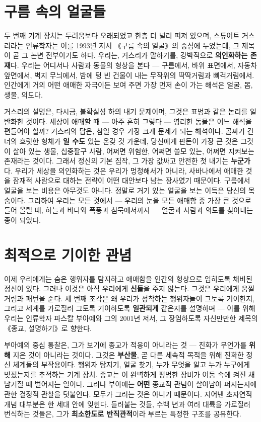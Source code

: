 \section*{구름 속의 얼굴들}

두 번째 기계 장치는 두려움보다 오래되었고 한층 더 널리 퍼져 있으며, 스튜어트 거스리라는 인류학자는 이를 1993년 저서 《구름 속의 얼굴》의 중심에 두었는데, 그 제목이 곧 그 논변 전부이기도 하다. 우리는, 거스리가 말하기를, 강박적으로 \textbf{의인화하는 존재}다. 우리는 어디서나 사람과 동물의 형상을 본다 — 구름에서, 바위 표면에서, 자동차 앞면에서, 벽지 무늬에서, 밤에 텅 빈 건물이 내는 무작위의 딱딱거림과 삐걱거림에서. 인간에게 거의 어떤 애매한 자극이든 보여 주면 가장 먼저 손이 가는 해석은 얼굴, 몸, 생물, 의도다.

거스리의 설명은, 다시금, 불확실성 하의 내기 문제이며, 그것은 표범과 같은 논리를 일반화한 것이다. 세상이 애매할 때 — 아주 흔히 그렇다 — 영리한 동물은 어느 해석을 편들어야 할까? 거스리의 답은, 참일 경우 가장 크게 문제가 되는 해석이다. 골짜기 건너의 흐릿한 형체가 \textbf{일 수도} 있는 온갖 것 가운데, 당신에게 판돈이 가장 큰 것은 그것이 살아 있는 생물, 십중팔구 사람, 어쩌면 위험한, 어쩌면 쓸모 있는, 어쩌면 지켜보는 존재라는 것이다. 그래서 정신의 기본 짐작, 그 가장 값싸고 안전한 첫 내기는 \textbf{누군가}다. 우리가 세상을 의인화하는 것은 우리가 멍청해서가 아니라, 사바나에서 애매한 것을 잠재적 사람으로 대하는 전략이 어떤 대안보다 남는 장사였기 때문이다. 구름에서 얼굴을 보는 비용은 아무것도 아니다. 정말로 거기 있는 얼굴을 보는 이득은 당신의 목숨이다. 그리하여 우리는 모든 것에서 — 우리의 눈을 모든 애매함 중 가장 큰 것으로 들어 올릴 때, 하늘과 바다와 폭풍과 침묵에서까지 — 얼굴과 사람과 의도를 찾아내는 종이 되었다.

\section*{최적으로 기이한 관념}

이제 우리에게는 숨은 행위자를 탐지하고 애매함을 인간의 형상으로 입히도록 채비된 정신이 있다. 그러나 이것은 아직 우리에게 \textbf{신들}을 주지 않는다. 그것은 우리에게 움찔거림과 패턴을 준다. 세 번째 조각은 왜 우리가 정착하는 행위자들이 그토록 기이한지, 그리고 세계를 가로질러 그토록 기이하도록 \textbf{일관되게} 같은지를 설명하며 — 이를 위해 우리는 인류학자 파스칼 부아예와 그의 2001년 저서, 그 장엄하도록 자신만만한 제목의 《종교, 설명하기》로 향한다.

부아예의 중심 통찰은, 그가 보기에 종교가 적응이 아니라는 것 — 진화가 무언가를 \textbf{위해} 지은 것이 아니라는 것이다. 그것은 \textbf{부산물}, 곧 다른 세속적 목적을 위해 진화한 정신 체계들의 부작용이다. 행위자 탐지기, 얼굴 찾기, 누가 무엇을 알고 누가 누구에게 빚졌는지를 추적하는 기계 장치. 종교는 이 완벽하게 평범한 장비가 어둠 속에 켜진 채 남겨질 때 벌어지는 일이다. 그러나 부아예는 \textbf{어떤} 종교적 관념이 살아남아 퍼지는지에 관한 결정적 관찰을 덧붙인다. 모두가 그러는 것은 아니기 때문이다. 지어낸 초자연적 개념 대부분은 한 세대 안에 잊힌다. 들러붙는 것들, 수백 년과 여러 대륙을 가로질러 번식하는 것들은, 그가 \textbf{최소한도로 반직관적}이라 부르는 특정한 구조를 공유한다.

